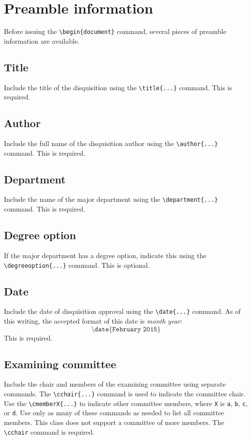 \documentclass{article}
\begin{document}
\section{Preamble information}
Before issuing the \texttt{\textbackslash begin\{document\}} command, several pieces of preamble information are available.
\subsection{Title}
Include the title of the disquisition using the \texttt{\textbackslash title\{...\}} command. This is required.

\subsection{Author}
Include the full name of the disquisition author using the \texttt{\textbackslash author\{...\}} command. This is required.

\subsection{Department}
Include the name of the major department using the \texttt{\textbackslash department\{...\}} command. This is required.

\subsection{Degree option}
If the major department has a degree option, indicate this using the \texttt{\textbackslash degreeoption\{...\}} command. This is optional.

\subsection{Date}
Include the date of disquisition approval using the \texttt{\textbackslash date\{...\}} command. As of this writing, the accepted format of this date is \textit{month year}: $$\texttt{\textbackslash date\{February 2015\}}$$ This is required.

\subsection{Examining committee}
Include the chair and members of the examining committee using separate commands. The \texttt{\textbackslash cchair\{...\}} command is used to indicate the committee chair. Use the \texttt{\textbackslash cmemberX\{...\}} to indicate other committee members, where \texttt{X} is \texttt{a}, \texttt{b}, \texttt{c}, or \texttt{d}. Use only as many of these commands as needed to list all committee members. This class does not support a committee of more members. The \texttt{\textbackslash cchair} command is required.
\end{document}
